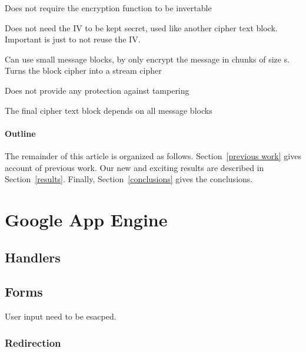 \documentclass[12pt]{article}
\begin{document}
\begin{list}{*}{
\setlength{\itemsep}{0pt}
\setlength{\parsep}{0pt}
\setlength{\topsep}{0pt}
\setlength{\partopsep}{0pt}
\setlength{\leftmargin}{2em}
\setlength{\labelwidth}{1.5em}
\setlength{\labelsep}{0.5em}
}
\item Does not require the encryption function to be invertable
\item Does not need the IV to be kept secret, used like another cipher text block. Important is just to not reuse the IV.
\item Can use small message blocks, by only encrypt the message in chunks of size s. Turns the block cipher into a stream cipher
\item Does not provide any protection against tampering
\item The final cipher text block depends on all message blocks
\end{list}

 
\paragraph{Outline}
The remainder of this article is organized as follows.
Section~\ref{previous work} gives account of previous work.
Our new and exciting results are described in Section~\ref{results}.
Finally, Section~\ref{conclusions} gives the conclusions.

\section{Google App Engine}

\subsection{Handlers}



\subsection{Forms}



User input need to be esacped.



\subsubsection{Redirection}
\end{document}

